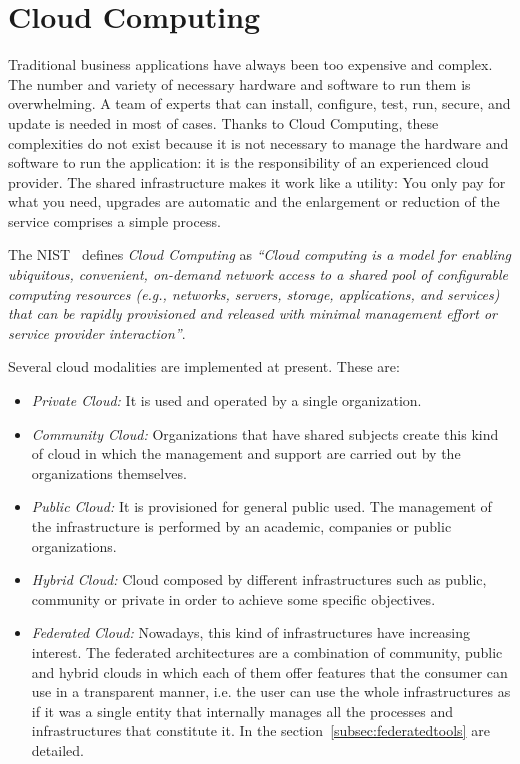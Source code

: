 \section{Cloud Computing}

Traditional business applications have always been too expensive and complex. The number and variety of necessary hardware and software to run them
is overwhelming. A team of experts that can install, configure, test, run,
secure, and update is needed in most of cases.
Thanks to Cloud Computing, these
complexities do not exist because it is not necessary to manage the hardware
and software to run the application: it is the responsibility of an experienced cloud provider. The
shared infrastructure makes it work like a utility: You only pay for what you
need, upgrades are automatic and the enlargement or reduction of the service
comprises a simple process.

The NIST~\cite{P.Mell2011} defines \emph{Cloud Computing} as \emph{``Cloud computing is a model for enabling ubiquitous, convenient, on-demand network access to a shared
pool of configurable computing resources (e.g., networks, servers, storage, applications, and services) that
can be rapidly provisioned and released with minimal management effort or
service provider interaction''}.

Several cloud modalities are implemented at present. These are:
\begin{itemize}
\item \emph{Private Cloud:} It is used and operated by a single organization.
\item \emph{Community Cloud:} Organizations that have shared subjects create
  this kind of cloud in which the management and support are carried out by the
  organizations themselves.
\item \emph{Public Cloud:} It is provisioned for  general public used. The
  management of the infrastructure is performed by an academic, companies or
  public organizations.
\item \emph{Hybrid Cloud:} Cloud composed by different infrastructures such as
  public,   community or private in order to achieve some specific objectives.
\item \emph{Federated Cloud:} Nowadays, this kind of infrastructures have
  increasing interest. The federated architectures are a combination of community, public
  and hybrid clouds in which each of them offer features that the consumer can
  use in a transparent manner, i.e. the user can use the whole infrastructures
  as if it was a single entity that internally manages all the processes and
  infrastructures that constitute it. In the section~\ref{subsec:federatedtools} are detailed.
\end{itemize}

